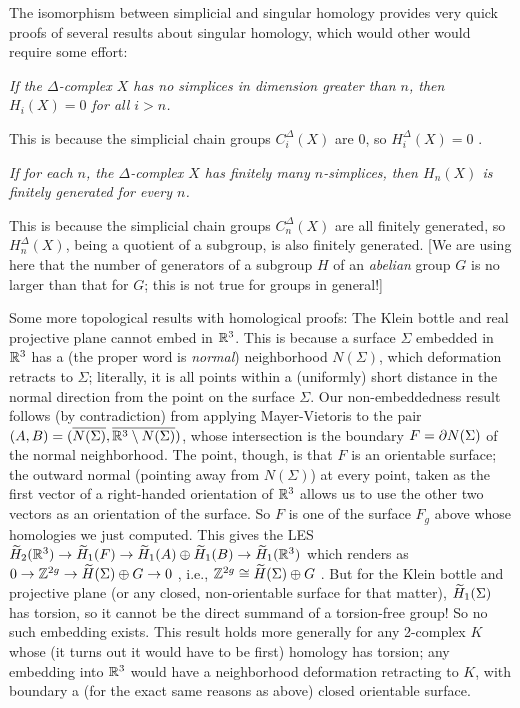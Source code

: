 \bsk






The isomorphism between simplicial and singular homology provides very quick proofs
of several results about singular homology, which would other would require some effort:

\ssk

{\it If the $\Delta$-complex $X$ has no simplices in dimension greater than $n$, then 
$H_i(X)=0$ for all $i>n$.}

\ssk

This is because the simplicial chain groups $C_i^\Delta(X)$ are $0$, so $H_i^\Delta(X)=0$ .

\ssk

{\it If for each $n$, the $\Delta$-complex $X$ has finitely many $n$-simplices, then 
$H_n(X)$ is finitely generated for every $n$.}

\ssk

This is because the simplicial chain groups $C_n^\Delta(X)$ are all finitely generated,
so $H_n^\Delta(X)$, being a quotient of a subgroup, is also finitely generated. [We
are using here that the number of generators of a subgroup $H$ of an {\it abelian} 
group $G$ is no larger than that for $G$; this is not true for groups in general!]


\bigskip

Some more topological results with homological proofs: The Klein bottle and real projective plane cannot 
embed in ${\Bbb R}^3$. This is because a surface $\Sigma$ embedded in ${\Bbb R}^3$ has a (the proper word is {\it normal})
neighborhood $N(\Sigma)$, which deformation retracts to $\Sigma$; literally, it is all points within a (uniformly) short distance
in the normal direction from the point on the surface $\Sigma$. Our non-embeddedness result follows (by contradiction)
from applying Mayer-Vietoris to the pair $(A,B) = (\overline{N(\Sigma)},\overline{{\Bbb R}^3\setminus N(\Sigma)})$, whose intersection
is the boundary $F=\partial N(\Sigma)$ of the normal neighborhood. The point, though, is that
$F$ is an orientable surface; the outward normal (pointing away from $N(\Sigma)$) at every point, taken as
the first vector of a right-handed orientation of ${\Bbb R}^3$ allows us to use the other two vectors as an 
orientation of the surface. So $F$ is one of the surface $F_g$ above whose homologies we just computed.
This gives the LES
\hhsk
$\widetilde{H}_2({\Bbb R}^3) \rightarrow \widetilde{H}_1(F) \rightarrow \widetilde{H}_1(A)\oplus \widetilde{H}_1(B)\rightarrow \widetilde{H}_1({\Bbb R} ^3)$
\hhsk 
which renders as 
\hhsk
$0\rightarrow{\Bbb Z}^{2g}\rightarrow \widetilde{H}(\Sigma)\oplus G\rightarrow 0$
\hhsk , i.e., \hhsk
${\Bbb Z}^{2g}\cong \widetilde{H}(\Sigma)\oplus G$ 
\hhsk . But for the Klein bottle and projective plane (or any closed, non-orientable
surface for that matter), $\widetilde{H}_1(\Sigma)$ has torsion, so it cannot be the direct
summand of a torsion-free group! So no such embedding exists. This result holds
more generally for any 2-complex $K$ whose (it turns out it would have to be first)
homology has torsion; any embedding into ${\Bbb R}^3$ would have a neighborhood 
deformation retracting to $K$, with boundary a (for the exact same reasons as above)
closed orientable surface.

